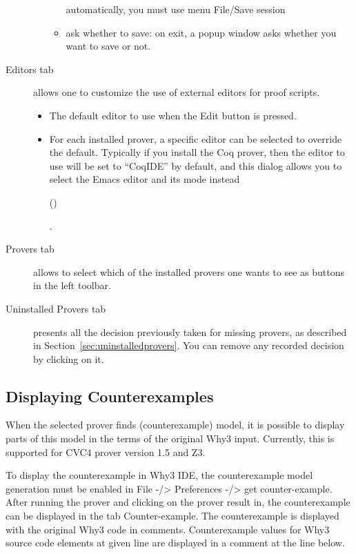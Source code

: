 \begin{description}
\begin{itemize}
\begin{itemize}
    automatically, you must use menu \textsf{File/Save session}
  \item ask whether to save: on exit, a popup window asks whether you
    want to save or not.
  \end{itemize}
\end{itemize}
\item[\textsf{Editors} tab] allows one to customize the use
  of external editors for proof scripts.
\begin{itemize}
\item The default editor to use when the \textsf{Edit} button is
  pressed.
\item For each installed prover, a specific editor can be selected to
  override the default. Typically if you install the Coq prover, then
  the editor to use will be set to ``CoqIDE'' by default, and this
  dialog allows you to select the Emacs editor and its
  mode instead%
 \begin{latexonly} (\urlprfgen)\end{latexonly}.
\end{itemize}
\item[\textsf{Provers} tab]
  allows to select which of the installed provers one wants to see
  as buttons in the left toolbar.
\item[\textsf{Uninstalled Provers} tab] presents all the
  decision previously taken for missing provers, as described in
  Section~\ref{sec:uninstalledprovers}. You can remove any recorded
  decision by clicking on it.
\end{description}

\subsection{Displaying Counterexamples}

When the selected prover finds (counterexample) model, it is possible to
display parts of this model in the terms of the original Why3 input.
Currently, this is supported for CVC4 prover version 1.5 and Z3.

To display the counterexample in Why3 IDE, the counterexample model generation
must be enabled in File -/> Preferences -/> get
counter-example.
After running the prover and clicking on the prover result in, the
counterexample can be displayed in the tab
Counter-example.
The counterexample is displayed with the original Why3 code in comments.
Counterexample values for Why3 source code elements at given line are
displayed in a comment at the line below.

